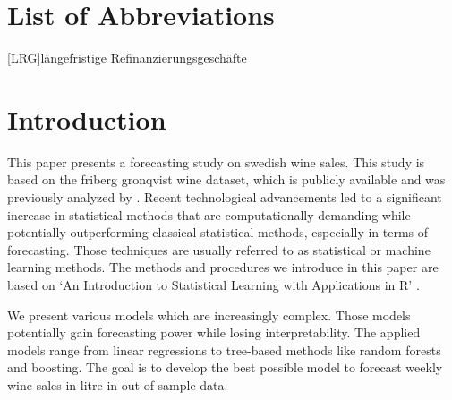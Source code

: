 \documentclass[11pt,]{article}
\begin{document}
\newpage
\listoffigures
{}

\listoftables
{}

\section*{List of Abbreviations}

\begin{adjustwidth}{1.5em}{0pt}

\begin{acronym}[dummyyyy]
 [LRG]{längefristige Refinanzierungsgeschäfte}

\end{acronym}

\end{adjustwidth}

\restoregeometry

\newpage
{}
\hypertarget{introduction}{%
\section{Introduction}\label{introduction}}

This paper presents a forecasting study on swedish wine sales. This
study is based on the friberg gronqvist wine dataset, which is publicly
available and was previously analyzed by
\textcite[][p. 193f.]{Friberg2012}. Recent technological advancements
led to a significant increase in statistical methods that are
computationally demanding while potentially outperforming classical
statistical methods, especially in terms of forecasting. Those
techniques are usually referred to as statistical or machine learning
methods. The methods and procedures we introduce in this paper are based
on `An Introduction to Statistical Learning with Applications in R'
\autocite[][]{James2014}.

We present various models which are increasingly complex. Those models
potentially gain forecasting power while losing interpretability. The
applied models range from linear regressions to tree-based methods like
random forests and boosting. The goal is to develop the best possible
model to forecast weekly wine sales in litre in out of sample data.
\end{document}
